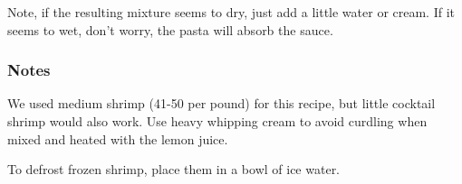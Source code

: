 Note, if the resulting mixture seems to dry, just add a little water or cream. If it seems to wet, don't worry, the pasta will absorb the sauce.

\subsubsection{Notes}
We used medium shrimp (41-50 per pound) for this recipe, but little cocktail shrimp would also work. Use heavy whipping cream to avoid curdling when mixed and heated with the lemon juice.

\noindent *To defrost frozen shrimp, place them in a bowl of ice water.
